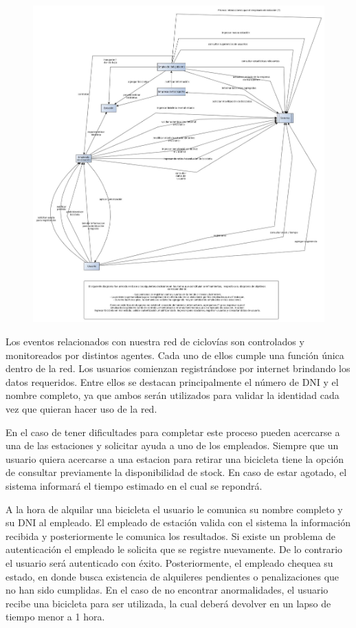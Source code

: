 \begin{figure}[H]
	\begin{center}
		  \includegraphics[scale=0.35]{diagrama_contexto.jpg}
		  \caption{}
		  \label{fig:contra1}
	\end{center}
\end{figure}

Los eventos relacionados con nuestra red de ciclovías son controlados y monitoreados por distintos agentes. Cada uno de ellos cumple una función única dentro de la red.
Los usuarios comienzan registrándose por internet brindando los datos requeridos. Entre ellos se destacan principalmente el número de DNI y el nombre completo, ya que ambos serán utilizados
para validar la identidad cada vez que quieran hacer uso de la red. 

En el caso de tener dificultades para completar este proceso pueden acercarse a una de las estaciones y solicitar ayuda a uno de los empleados.
Siempre que un usuario quiera acercarse a una estacion para retirar una bicicleta tiene la opción de consultar previamente la disponibilidad de stock. En caso de estar agotado, el sistema informará el tiempo
estimado en el cual se repondrá.

A la hora de alquilar una bicicleta el usuario le comunica su nombre completo y su DNI al empleado. El empleado de estación valida con el sistema la información recibida y posteriormente le comunica
los resultados. Si existe un problema de autenticación el empleado le solicita que se registre nuevamente. De lo contrario el usuario será autenticado con éxito. Posteriormente, el empleado chequea 
su estado, en donde busca existencia de alquileres pendientes o penalizaciones que no han sido cumplidas. En el caso de no encontrar anormalidades, el usuario
recibe una bicicleta para ser utilizada, la cual deberá devolver en un lapso de tiempo menor a 1 hora.

